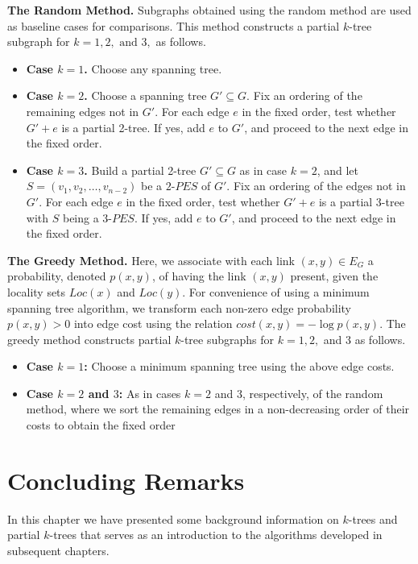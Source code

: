 \nwline
{\bf The Random Method.} Subgraphs obtained using the random method are used as baseline cases for comparisons. This method constructs a partial $k$-tree subgraph for $k=1,2, \mbox{ and }3,$ as follows.
\begin{itemize}
\item {\bf Case $k=1$.} Choose any spanning tree.
\item {\bf Case $k=2$.} Choose a spanning tree $G'\subseteq G$. Fix an ordering of the remaining edges not in $G'$. For each edge $e$ in the fixed order, test whether $G'+e$ is a partial 2-tree. If yes, add $e$ to $G'$, and proceed to the next edge in the fixed order.
\item {\bf Case $k=3$.} Build a partial 2-tree $G'\subseteq G$ as in case $k=2$, and let $S=(v_1,v_2, \ldots,v_{n-2})$ be a $2$-$PES$ of $G'$. Fix an ordering of the edges not in $G'$. For each edge $e$ in the fixed order, test whether $G'+e$ is a partial 3-tree with $S$ being a 3-$PES$.  If yes, add $e$ to $G'$, and proceed to the next edge in the fixed order.
\end{itemize}
\nwline
{\bf The Greedy Method.} Here, we associate with each link $(x,y)\in E_G$ a probability, denoted $p(x,y)$, of having the link $(x,y)$ present, given the locality sets $Loc(x)$ and $Loc(y)$. For convenience of using a minimum spanning tree algorithm, we transform each non-zero edge probability $p(x,y)> 0$ into edge cost using the relation $cost(x,y)=-\log p(x,y)$. The greedy method constructs partial $k$-tree subgraphs for $k=1,2,$ and $3$ as follows.
\begin{itemize}
\item {\bf Case $k=1$:} Choose a minimum spanning tree using the above edge costs.
\item {\bf Case $k=2$ and $3$:} As in cases $k=2$ and $3$, respectively, of the random method, where we sort the remaining edges in a non-decreasing order of their costs to obtain the fixed order
\end{itemize}



\section{Concluding Remarks}
\label{ch2:sum}
In this chapter we have presented some background information on $k$-trees and partial $k$-trees that serves as an introduction to the algorithms developed in subsequent chapters.